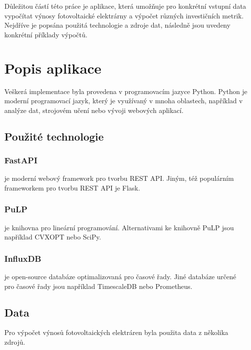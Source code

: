 Důležitou částí této práce je aplikace, která umožňuje pro konkrétní vstupní data vypočítat výnosy fotovoltaické elektrárny a výpočet různých investičních metrik.
Nejdříve je popsána použitá technologie a zdroje dat, následně jsou uvedeny konkrétní příklady výpočtů.

\section{Popis aplikace}

Veškerá implementace byla provedena v programovacím jazyce Python. Python je moderní programovací jazyk, který je využívaný v mnoha oblastech, například v analýze dat, strojovém učení nebo vývoji webových aplikací.



\subsection{Použité technologie}

\subsubsection{FastAPI} je moderní webový framework pro tvorbu REST API.
Jiným, též populárním frameworkem pro tvorbu REST API je Flask.

\subsubsection{PuLP} je knihovna pro lineární programování.
Alternativami ke knihovně PuLP jsou například CVXOPT nebo SciPy.

\subsubsection{InfluxDB} je open-source databáze optimalizovaná pro časové řady.
Jiné databáze určené pro časové řady jsou například TimescaleDB nebo Prometheus.

\subsection{Data}

Pro výpočet výnosů fotovoltaických elektráren byla použita data z několika zdrojů.

